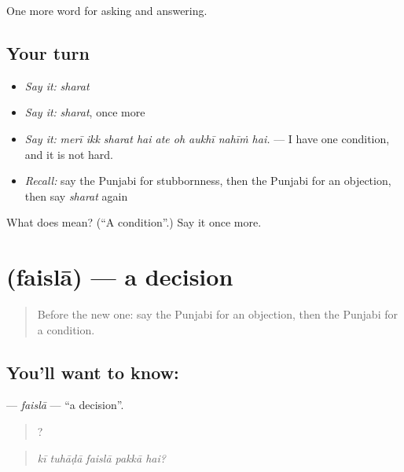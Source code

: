 \begin{grammarlens}[title={What you've built}]
One more word for asking and answering.
\end{grammarlens}

\subsection*{Your turn}
\begin{itemize}
\raggedright
  \item \emph{Say it:} \emph{sharat}
  \item \emph{Say it:} \emph{sharat}, once more
  \item \emph{Say it:} \emph{merī ikk sharat hai ate oh aukhī nahīṁ hai.} — I have one condition, and it is not hard.
  \item \emph{Recall:} say the Punjabi for stubbornness, then the Punjabi for an objection, then say \emph{sharat} again
\end{itemize}

\begin{tcolorbox}[breakable,colback=teal!4,colframe=teal!35!black,title={Before you move on}]
What does  mean? (\textquotedblleft{}A condition\textquotedblright{}.) Say it once more.
\end{tcolorbox}
\section[\texorpdfstring{\pa{ਫ਼ੈਸਲਾ} (faislā)}{ਫ਼ੈਸਲਾ (faislā)}]{ (faislā) — a decision}

\label{lesson:PA-C345-faisla}



\begin{quote}
Before the new one: say the Punjabi for an objection, then the Punjabi for a condition.
\end{quote}

\subsection*{You'll want to know: }
\textbf{} — \emph{faislā} — \textquotedblleft{}a decision\textquotedblright{}.

\begin{quote}
    ?
\end{quote}

\begin{quote}
\emph{kī tuhāḍā faislā pakkā hai?}
\end{quote}

